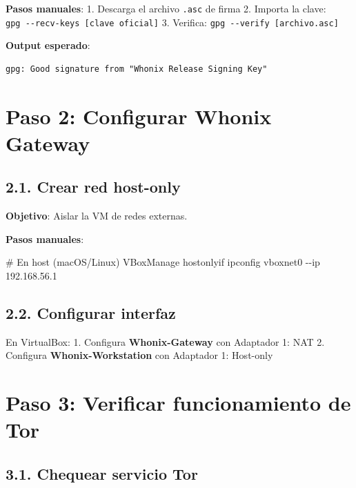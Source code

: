\documentclass[
  letterpaper,
]{report}
\newenvironment{Shaded}{\begin{snugshade}}{\end{snugshade}}
\newcommand{\AttributeTok}[1]{\textcolor[rgb]{0.40,0.45,0.13}{#1}}
\newcommand{\CommentTok}[1]{\textcolor[rgb]{0.37,0.37,0.37}{#1}}
\newcommand{\ExtensionTok}[1]{\textcolor[rgb]{0.00,0.23,0.31}{#1}}
\newcommand{\NormalTok}[1]{\textcolor[rgb]{0.00,0.23,0.31}{#1}}
\begin{document}
\textbf{Pasos manuales}: 1. Descarga el archivo \texttt{.asc} de firma
2. Importa la clave: \texttt{gpg\ -\/-recv-keys\ {[}clave\ oficial{]}}
3. Verifica: \texttt{gpg\ -\/-verify\ {[}archivo.asc{]}}

\textbf{Output esperado}:

\begin{verbatim}
gpg: Good signature from "Whonix Release Signing Key"
\end{verbatim}

\section{Paso 2: Configurar Whonix
Gateway}\label{paso-2-configurar-whonix-gateway}

\subsection{2.1. Crear red host-only}\label{crear-red-host-only}

\textbf{Objetivo}: Aislar la VM de redes externas.

\textbf{Pasos manuales}:

\begin{Shaded}
\begin{Highlighting}[]
\CommentTok{\# En host (macOS/Linux)}
\ExtensionTok{VBoxManage}\NormalTok{ hostonlyif ipconfig vboxnet0 }\AttributeTok{{-}{-}ip}\NormalTok{ 192.168.56.1}
\end{Highlighting}
\end{Shaded}

\subsection{2.2. Configurar interfaz}\label{configurar-interfaz}

En VirtualBox: 1. Configura \textbf{Whonix-Gateway} con Adaptador 1: NAT
2. Configura \textbf{Whonix-Workstation} con Adaptador 1: Host-only

\section{Paso 3: Verificar funcionamiento de
Tor}\label{paso-3-verificar-funcionamiento-de-tor}

\subsection{3.1. Chequear servicio Tor}\label{chequear-servicio-tor}
\end{document}
